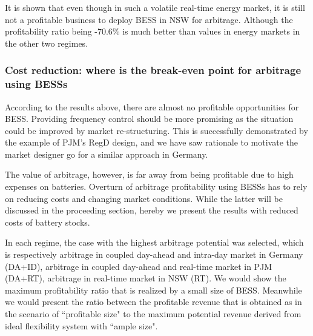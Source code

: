 It is shown that even though in such a volatile real-time energy market, it is still not a profitable business to deploy BESS in NSW for arbitrage. Although the profitability ratio being -70.6\% is much better than values in energy markets in the other two regimes. 
~\newpage
\subsubsection{Cost reduction: where is the break-even point for arbitrage using BESSs}

According to the results above, there are almost no profitable opportunities for BESS.  Providing frequency control should be more promising as the situation could be improved by market re-structuring. This is successfully demonstrated by the example of PJM's RegD design, and we have saw rationale to motivate the market designer go for a similar approach in Germany.

The value of arbitrage, however, is far away from being profitable due to high expenses on batteries. Overturn of arbitrage profitability using BESSs has to rely on reducing costs and changing market conditions. While the latter will be discussed in the proceeding section, hereby we present the results with reduced costs of battery stocks. 

In each regime, the case with the highest arbitrage potential was selected, which is respectively arbitrage in coupled day-ahead and intra-day market in Germany (DA+ID), arbitrage in coupled day-ahead and real-time market in PJM (DA+RT), arbitrage in real-time market in NSW (RT). We would show the maximum profitability ratio that is realized by a small size of BESS. Meanwhile  we would present the ratio between the  profitable revenue that is obtained as in the scenario of ``profitable size" to the maximum potential revenue derived from ideal flexibility system with ``ample size". 


